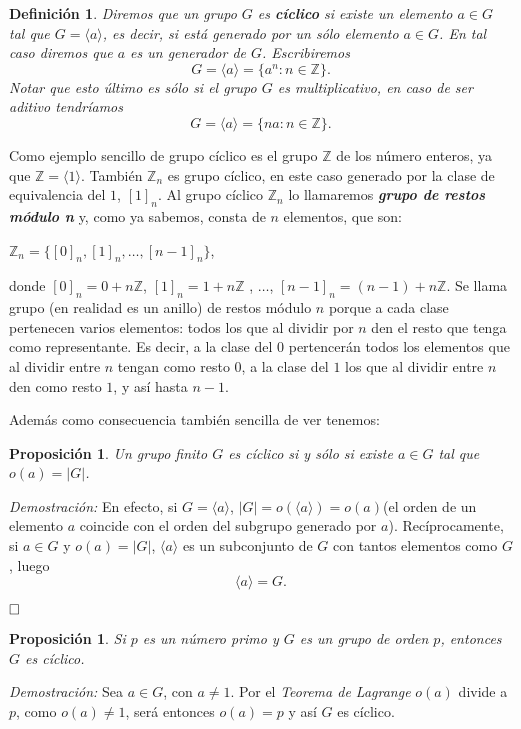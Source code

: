 \documentclass[12pt]{article}
\newtheorem{proposition}[theorem]{Proposición}
\newtheorem{definition}[theorem]{Definición}
\begin{document}
\begin{definition}
Diremos que un grupo $G$ es \textbf{cíclico} si existe un elemento $a \in G$ tal que $G = \langle a \rangle$, es decir, si está generado por un sólo elemento $a \in G$. En tal caso diremos que $a$ es un \textit{generador} de $G$. Escribiremos
$$G = \langle a \rangle = \lbrace a^{n} : n \in \mathbb{Z}\rbrace.$$
Notar que esto último es sólo si el grupo $G$ es multiplicativo, en caso de ser aditivo tendríamos $$G = \langle a \rangle = \lbrace na : n \in \mathbb{Z}\rbrace.$$
\end{definition}

Como ejemplo sencillo de grupo cíclico es el grupo $\mathbb{Z}$ de los número enteros, ya que $\mathbb{Z} = \langle 1 \rangle$. También $\mathbb{Z}_{n}$ es grupo cíclico, en este caso generado por la clase de equivalencia del $1$, $\left[ 1 \right]_{n}$. Al grupo cíclico $\mathbb{Z}_{n}$ lo llamaremos \textbf{\textit{grupo de restos módulo n}} y, como ya sabemos, consta de $n$ elementos, que son:

\begin{center}
$\mathbb{Z}_{n} = \lbrace \left[ 0 \right]_{n}, \left[ 1 \right]_{n}, \ldots, \left[ n-1 \right]_{n} \rbrace$,
\end{center}
donde $\left[ 0 \right]_{n} = 0 + n\mathbb{Z}$, $\left[ 1 \right]_{n} = 1 +n\mathbb{Z}$ , $\ldots$, $\left[ n-1 \right]_{n} = (n-1) + n\mathbb{Z}$. Se llama grupo (en realidad es un anillo) de restos módulo $n$ porque a cada clase pertenecen varios elementos: todos los que al dividir por $n$ den el resto que tenga como representante. Es decir, a la clase del $0$ pertencerán todos los elementos que al dividir entre $n$ tengan como resto $0$, a la clase del $1$ los que al dividir entre $n$ den como resto $1$, y así hasta $n-1$.

Además como consecuencia también sencilla de ver tenemos:

\begin{proposition}Un grupo finito $G$ es cíclico si y sólo si existe $a \in G$ tal que $o(a) = |G|$.
\end{proposition}
\emph{Demostración: }En efecto, si $G = \langle a \rangle$, $|G| = o( \langle a \rangle) = o(a)$(el orden de un elemento $a$ coincide con el orden del subgrupo generado por $a$). Recíprocamente, si $a \in G$ y $o(a) = |G|$, $\langle a \rangle$ es un subconjunto de $G$ con tantos elementos como $G$, luego $$\langle a \rangle = G.$$

$\hfill \square$

\begin{proposition}
Si $p$ es un número primo y $G$ es un grupo de orden $p$, entonces $G$ es cíclico.
\end{proposition}
\emph{Demostración: } Sea $a \in G$, con $a \neq 1$. Por el \textit{Teorema de Lagrange} $o(a)$ divide a $p$, como $o(a) \neq 1$, será entonces $o(a) = p$ y así $G$ es cíclico.
\end{document}
